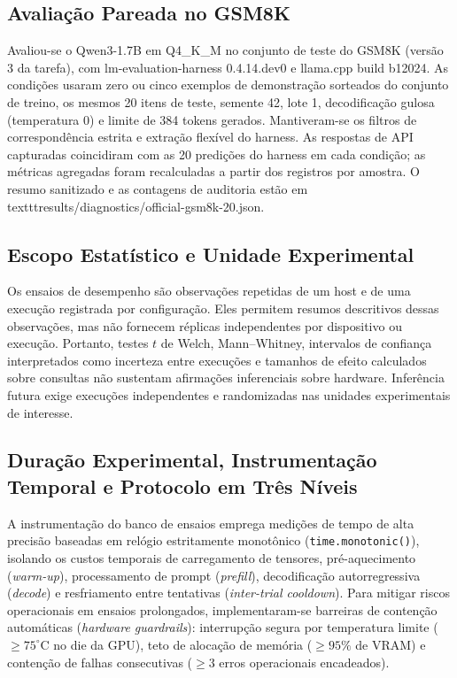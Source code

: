 \documentclass[10pt,a4paper,twocolumn]{article}
\begin{document}
\subsection{Avalia\c{c}\~ao Pareada no GSM8K}

Avaliou-se o Qwen3-1.7B em Q4\_K\_M no conjunto de teste do GSM8K (vers\~ao 3 da tarefa), com lm-evaluation-harness 0.4.14.dev0 e llama.cpp build b12024. As condi\c{c}\~oes usaram zero ou cinco exemplos de demonstra\c{c}\~ao sorteados do conjunto de treino, os mesmos 20 itens de teste, semente 42, lote 1, decodifica\c{c}\~ao gulosa (temperatura 0) e limite de 384 tokens gerados. Mantiveram-se os filtros de correspond\^encia estrita e extra\c{c}\~ao flex\'ivel do harness. As respostas de API capturadas coincidiram com as 20 predi\c{c}\~oes do harness em cada condi\c{c}\~ao; as m\'etricas agregadas foram recalculadas a partir dos registros por amostra. O resumo sanitizado e as contagens de auditoria est\~ao em \\texttt{results/diagnostics/official-gsm8k-20.json}.

\subsection{Escopo Estat\'istico e Unidade Experimental}

Os ensaios de desempenho s\~ao observa\c{c}\~oes repetidas de um host e de uma execu\c{c}\~ao registrada por configura\c{c}\~ao. Eles permitem resumos descritivos dessas observa\c{c}\~oes, mas n\~ao fornecem r\'eplicas independentes por dispositivo ou execu\c{c}\~ao. Portanto, testes $t$ de Welch, Mann--Whitney, intervalos de confian\c{c}a interpretados como incerteza entre execu\c{c}\~oes e tamanhos de efeito calculados sobre consultas n\~ao sustentam afirma\c{c}\~oes inferenciais sobre hardware. Infer\^encia futura exige execu\c{c}\~oes independentes e randomizadas nas unidades experimentais de interesse.

\subsection{Dura\c{c}\~ao Experimental, Instrumenta\c{c}\~ao Temporal e Protocolo em Tr\^es N\'iveis}

A instrumenta\c{c}\~ao do banco de ensaios emprega medi\c{c}\~oes de tempo de alta precis\~ao baseadas em rel\'ogio estritamente monot\^onico (\texttt{time.monotonic()}), isolando os custos temporais de carregamento de tensores, pr\'e-aquecimento (\emph{warm-up}), processamento de prompt (\emph{prefill}), decodifica\c{c}\~ao autorregressiva (\emph{decode}) e resfriamento entre tentativas (\emph{inter-trial cooldown}). Para mitigar riscos operacionais em ensaios prolongados, implementaram-se barreiras de conten\c{c}\~ao autom\'aticas (\emph{hardware guardrails}): interrup\c{c}\~ao segura por temperatura limite ($\ge 75^\circ\text{C}$ no die da GPU), teto de aloca\c{c}\~ao de mem\'oria ($\ge 95\%$ de VRAM) e conten\c{c}\~ao de falhas consecutivas ($\ge 3$ erros operacionais encadeados).
\end{document}

